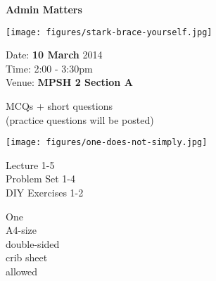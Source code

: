 \begin{cf}{
		\textbf{Admin Matters}
}
\end{cf}


\begin{cf}{
		\texttt{[image: figures/stark-brace-yourself.jpg]}
}
\end{cf}

\begin{cf}
		Date: \textbf{10 March} 2014\\
		Time: 2:00 - 3:30pm\\
		Venue: \textbf{\color{red} MPSH 2 Section A}\\
\end{cf}

\begin{cf}
MCQs + short questions\\
(practice questions will be posted)
\end{cf}

\begin{cf}{
		\texttt{[image: figures/one-does-not-simply.jpg]}
}
\end{cf}

\begin{cf}
Lecture 1-5\\
Problem Set 1-4\\
DIY Exercises 1-2\\
\end{cf}

\begin{cf}
		One\\
		A4-size\\
		double-sided\\
		crib sheet\\
		allowed
\end{cf}
